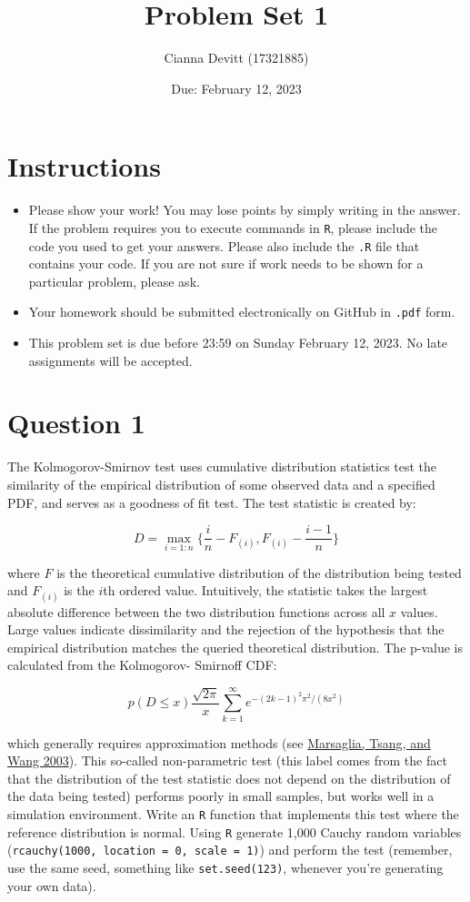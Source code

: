 \documentclass[12pt,letterpaper]{article}
\title{Problem Set 1}
\date{Due: February 12, 2023}
\author{Cianna Devitt (17321885)}
\begin{document}
	\maketitle
	\section*{Instructions}
	\begin{itemize}
		\item Please show your work! You may lose points by simply writing in the answer. If the problem requires you to execute commands in \texttt{R}, please include the code you used to get your answers. Please also include the \texttt{.R} file that contains your code. If you are not sure if work needs to be shown for a particular problem, please ask.
		\item Your homework should be submitted electronically on GitHub in \texttt{.pdf} form.
		\item This problem set is due before 23:59 on Sunday February 12, 2023. No late assignments will be accepted.
	\end{itemize}
	
	\vspace{.25cm}
	\section*{Question 1} 
	\vspace{.25cm}
	\noindent The Kolmogorov-Smirnov test uses cumulative distribution statistics test the similarity of the empirical distribution of some observed data and a specified PDF, and serves as a goodness of fit test. The test statistic is created by:
	
	$$D = \max_{i=1:n} \Big\{ \frac{i}{n}  - F_{(i)}, F_{(i)} - \frac{i-1}{n} \Big\}$$
	
	\noindent where $F$ is the theoretical cumulative distribution of the distribution being tested and $F_{(i)}$ is the $i$th ordered value. Intuitively, the statistic takes the largest absolute difference between the two distribution functions across all $x$ values. Large values indicate dissimilarity and the rejection of the hypothesis that the empirical distribution matches the queried theoretical distribution. The p-value is calculated from the Kolmogorov-
	Smirnoff CDF:
	
	$$p(D \leq x) \frac{\sqrt {2\pi}}{x} \sum _{k=1}^{\infty }e^{-(2k-1)^{2}\pi ^{2}/(8x^{2})}$$
	
	
	\noindent which generally requires approximation methods (see \href{https://core.ac.uk/download/pdf/25787785.pdf}{Marsaglia, Tsang, and Wang 2003}). This so-called non-parametric test (this label comes from the fact that the distribution of the test statistic does not depend on the distribution of the data being tested) performs poorly in small samples, but works well in a simulation environment. Write an \texttt{R} function that implements this test where the reference distribution is normal. Using \texttt{R} generate 1,000 Cauchy random variables (\texttt{rcauchy(1000, location = 0, scale = 1)}) and perform the test (remember, use the same seed, something like \texttt{set.seed(123)}, whenever you're generating your own data).\\
	
\end{document}
